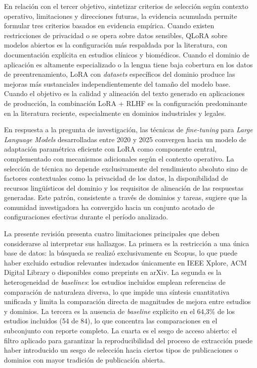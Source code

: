 En relación con el tercer objetivo, sintetizar criterios de selección según contexto operativo, limitaciones y direcciones futuras, la evidencia acumulada permite formular tres criterios basados en evidencia empírica. Cuando existen restricciones de privacidad o se opera sobre datos sensibles, QLoRA sobre modelos abiertos es la configuración más respaldada por la literatura, con documentación explícita en estudios clínicos y biomédicos. Cuando el dominio de aplicación es altamente especializado o la lengua tiene baja cobertura en los datos de preentrenamiento, LoRA con \textit{datasets} específicos del dominio produce las mejoras más sustanciales independientemente del tamaño del modelo base. Cuando el objetivo es la calidad y alineación del texto generado en aplicaciones de producción, la combinación LoRA + RLHF es la configuración predominante en la literatura reciente, especialmente en dominios industriales y legales.

En respuesta a la pregunta de investigación, las técnicas de \textit{fine-tuning} para \textit{Large Language Models} desarrolladas entre 2020 y 2025 convergen hacia un modelo de adaptación paramétrica eficiente con LoRA como componente central, complementado con mecanismos adicionales según el contexto operativo. La selección de técnica no depende exclusivamente del rendimiento absoluto sino de factores contextuales como la privacidad de los datos, la disponibilidad de recursos lingüísticos del dominio y los requisitos de alineación de las respuestas generadas. Este patrón, consistente a través de dominios y tareas, sugiere que la comunidad investigadora ha convergido hacia un conjunto acotado de configuraciones efectivas durante el período analizado.

La presente revisión presenta cuatro limitaciones principales que deben considerarse al interpretar sus hallazgos. La primera es la restricción a una única base de datos: la búsqueda se realizó exclusivamente en Scopus, lo que puede haber excluido estudios relevantes indexados únicamente en IEEE Xplore, ACM Digital Library o disponibles como preprints en arXiv. La segunda es la heterogeneidad de \textit{baselines}: los estudios incluidos emplean referencias de comparación de naturaleza diversa, lo que impide una síntesis cuantitativa unificada y limita la comparación directa de magnitudes de mejora entre estudios y dominios. La tercera es la ausencia de \textit{baseline} explícito en el 64,3\% de los estudios incluidos (54 de 84), lo que concentra las comparaciones en el subconjunto con reporte completo. La cuarta es el sesgo de acceso abierto: el filtro aplicado para garantizar la reproducibilidad del proceso de extracción puede haber introducido un sesgo de selección hacia ciertos tipos de publicaciones o dominios con mayor tradición de publicación abierta.


